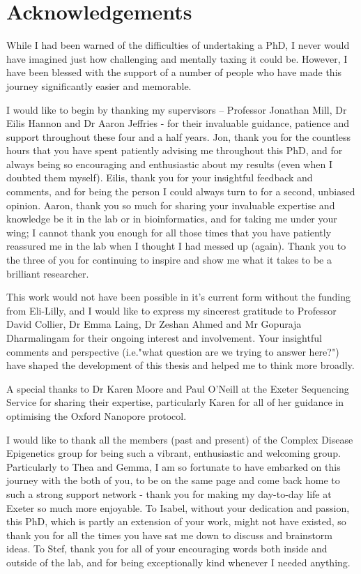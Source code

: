 \chapter*{Acknowledgements}

\begingroup
\singlespacing
While I had been warned of the difficulties of undertaking a PhD, I never would have imagined just how challenging and mentally taxing it could be. However, I have been blessed with the support of a number of people who have made this journey significantly easier and memorable. 

I would like to begin by thanking my supervisors – Professor Jonathan Mill, Dr Eilis Hannon and Dr Aaron Jeffries - for their invaluable guidance, patience and support throughout these four and a half years. Jon, thank you for the countless hours that you have spent patiently advising me throughout this PhD, and for always being so encouraging and enthusiastic about my results (even when I doubted them myself). Eilis, thank you for your insightful feedback and comments, and for being the person I could always turn to for a second, unbiased opinion. Aaron, thank you so much for sharing your invaluable expertise and knowledge be it in the lab or in bioinformatics, and for taking me under your wing; I cannot thank you enough for all those times that you have patiently reassured me in the lab when I thought I had messed up (again). Thank you to the three of you for continuing to inspire and show me what it takes to be a brilliant researcher. 

This work would not have been possible in it's current form without the funding from Eli-Lilly, and I would like to express my sincerest gratitude to Professor David Collier, Dr Emma Laing, Dr Zeshan Ahmed and Mr Gopuraja Dharmalingam for their ongoing interest and involvement. Your insightful comments and perspective (i.e."what question are we trying to answer here?") have shaped the development of this thesis and helped me to think more broadly. 

A special thanks to Dr Karen Moore and Paul O’Neill at the  Exeter Sequencing Service for sharing their expertise, particularly Karen for all of her guidance in optimising the Oxford Nanopore protocol.

I would like to thank all the members (past and present) of the Complex Disease Epigenetics group for being such a vibrant, enthusiastic and welcoming group. Particularly to Thea and Gemma, I am so fortunate to have embarked on this journey with the both of you, to be on the same page and come back home to such a strong support network - thank you for making my day-to-day life at Exeter so much more enjoyable. To Isabel, without your dedication and passion, this PhD, which is partly an extension of your work, might not have existed, so thank you for all the times you have sat me down to discuss and brainstorm ideas. To Stef, thank you for all of your encouraging words both inside and outside of the lab, and for being exceptionally kind whenever I needed anything. 

